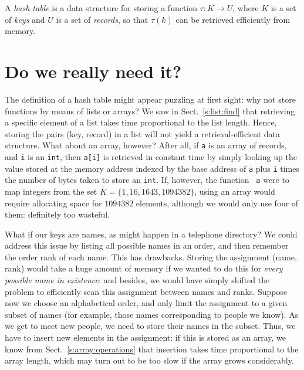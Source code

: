 \documentclass[a4paper]{book}
\theoremstyle{changebreak}                %
\begin{document}
A {\it hash table} is a data structure for storing a
function $\tau:K\to U$, where $K$ is a set of {\it keys}
and $U$ is a set of {\it records}, so that $\tau(k)$ can
be retrieved efficiently from memory.

\section{Do we really need it?}
\label{s:hash:critique}
The definition of a hash table might appear puzzling at first sight:
why not store functions by means of lists or arrays? We saw in
Sect.~\ref{s:list:find} that retrieving a specific element of a
list takes time proportional to the list length. Hence,
storing the pairs (key, record) in a list will not yield a
retrieval-efficient data structure. What about an array,
however? After all, if {\tt a} is an array of records, and {\tt i} is
an {\tt int}, then {\tt a[i]} is retrieved in constant
time by simply looking up the value stored at the
memory address indexed by the base
address of {\tt a} plus {\tt i} times the number
of bytes taken to store an {\tt int}. If, however, the function {\tt
  a} were to map integers from the set $K=\{1,16,1643,1094382\}$,
using an array would require allocating space for $1094382$ elements,
although we would only use four of them: definitely too wasteful.

What if our keys are names, as might happen in a telephone directory?
We could address this issue by listing all possible names in an order,
and then remember the order rank of each name. This
has drawbacks. Storing the assignment (name, rank)
would take a huge amount of memory if we wanted to do this for {\it
  every possible name in existence}: and besides, we would have simply
shifted the problem to efficiently scan this assignment between names
and ranks. Suppose now we choose an alphabetical
order, and only limit the assignment to a
given subset of names (for example, those names corresponding to
people we know). As we get to meet new people, we need to store their
names in the subset. Thus, we have to insert new elements in the
assignment: if this is stored as an array, we know from
Sect.~\ref{s:array:operations} that insertion
takes time proportional to the array length, which may turn out to be
too slow if the array grows considerably.
\end{document}
